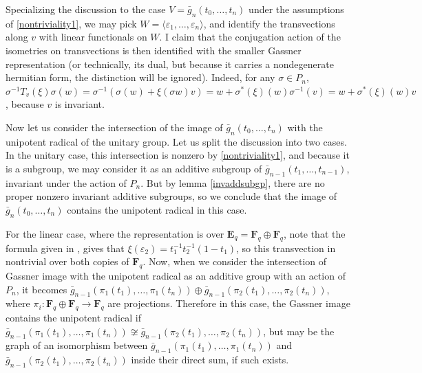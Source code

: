 \documentclass{article}
\theoremstyle{definition}
\begin{document}
	Specializing the discussion to the case $V=\bar{g}_n(t_0, \ldots, t_n)$ under the assumptions of \ref{nontriviality1}, we may pick $W = \langle \varepsilon_1, \ldots, \varepsilon_n \rangle$, and identify the transvections along $v$ with linear functionals on $W$. I claim that the conjugation action of the isometries on transvections is then identified with the smaller Gassner representation (or technically, its dual, but because it carries a nondegenerate hermitian form, the distinction will be ignored). Indeed, for any $\sigma \in P_n$, $\sigma^{-1} T_v(\xi) \sigma (w) = \sigma^{-1}(\sigma(w)+\xi(\sigma w)v)=w+\sigma^*(\xi)(w)\sigma^{-1}(v)=w+\sigma^*(\xi)(w)v$, because $v$ is invariant. \par 
	Now let us consider the intersection of the image of $\bar{g}_n(t_0, \ldots, t_n)$ with the unipotent radical of the unitary group. Let us split the discussion into two cases. In the unitary case, this intersection is nonzero by \ref{nontriviality1}, and because it is a subgroup, we may consider it as an additive subgroup of $\bar{g}_{n-1}(t_1, \ldots, t_{n-1})$, invariant under the action of $P_n$. But by lemma \ref{invaddsubgp}, there are no proper nonzero invariant additive subgroups, so we conclude that the image of $\bar{g}_n(t_0, \ldots, t_n)$ contains the unipotent radical in this case. \par 
	For the linear case, where the representation is over $\mathbf{E}_q = \mathbf{F}_q \oplus \mathbf{F}_q$, note that the formula given in \cite[Proposition 21]{cyclic}, gives that $\xi(\varepsilon_2) = t_1^{-1}t_2^{-1}(1-t_1)$, so this transvection in nontrivial over both copies of $\mathbf{F}_q$. Now, when we consider the intersection of Gassner image with the unipotent radical as an additive group with an action of $P_n$, it becomes $\bar{g}_{n-1}(\pi_1(t_1), \ldots, \pi_1(t_n)) \oplus \bar{g}_{n-1}(\pi_2(t_1), \ldots, \pi_2(t_n))$, where $\pi_i : \mathbf{F}_q \oplus \mathbf{F}_q \to \mathbf{F}_q$ are projections. Therefore in this case, the Gassner image contains the unipotent radical if $\bar{g}_{n-1}(\pi_1(t_1), \ldots, \pi_1(t_n)) \not \cong \bar{g}_{n-1}(\pi_2(t_1), \ldots, \pi_2(t_n))$, but may be the graph of an isomorphism between $\bar{g}_{n-1}(\pi_1(t_1), \ldots, \pi_1(t_n))$ and $\bar{g}_{n-1}(\pi_2(t_1), \ldots, \pi_2(t_n))$ inside their direct sum, if such exists. 
\end{document}

